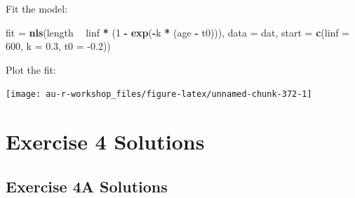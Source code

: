 \documentclass[]{book}
\newenvironment{Shaded}{\begin{snugshade}}{\end{snugshade}}
\newcommand{\DataTypeTok}[1]{\textcolor[rgb]{0.13,0.29,0.53}{#1}}
\newcommand{\DecValTok}[1]{\textcolor[rgb]{0.00,0.00,0.81}{#1}}
\newcommand{\FloatTok}[1]{\textcolor[rgb]{0.00,0.00,0.81}{#1}}
\newcommand{\KeywordTok}[1]{\textcolor[rgb]{0.13,0.29,0.53}{\textbf{#1}}}
\newcommand{\NormalTok}[1]{#1}
\newcommand{\OperatorTok}[1]{\textcolor[rgb]{0.81,0.36,0.00}{\textbf{#1}}}
\newcommand{\StringTok}[1]{\textcolor[rgb]{0.31,0.60,0.02}{#1}}
\begin{document}
Fit the model:

\begin{Shaded}
\begin{Highlighting}[]
\NormalTok{fit =}\StringTok{ }\KeywordTok{nls}\NormalTok{(length }\OperatorTok{~}\StringTok{ }\NormalTok{linf }\OperatorTok{*}\StringTok{ }\NormalTok{(}\DecValTok{1} \OperatorTok{-}\StringTok{ }\KeywordTok{exp}\NormalTok{(}\OperatorTok{-}\NormalTok{k }\OperatorTok{*}\StringTok{ }\NormalTok{(age }\OperatorTok{-}\StringTok{ }\NormalTok{t0))),}
          \DataTypeTok{data =}\NormalTok{ dat, }\DataTypeTok{start =} \KeywordTok{c}\NormalTok{(}\DataTypeTok{linf =} \DecValTok{600}\NormalTok{, }\DataTypeTok{k =} \FloatTok{0.3}\NormalTok{, }\DataTypeTok{t0 =} \FloatTok{-0.2}\NormalTok{))}
\end{Highlighting}
\end{Shaded}

Plot the fit:

\begin{Shaded}
\end{Shaded}

\begin{center}\texttt{[image: au-r-workshop\_files/figure-latex/unnamed-chunk-372-1]} \end{center}

\hypertarget{ex4-answers}{%
\section*{Exercise 4 Solutions}\label{ex4-answers}}

\hypertarget{ex4a-answers}{%
\subsection*{Exercise 4A Solutions}\label{ex4a-answers}}
\end{document}
